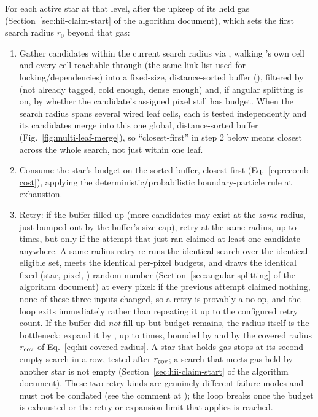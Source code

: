 For each active star at that level, after the upkeep of its held gas
(Section~\ref{sec:hii-claim-start} of the algorithm document), which sets the
first search radius $r_0$ beyond that gas:
\begin{enumerate}
  \item Gather candidates within the current search radius via
    ,
    walking 's own cell and every cell reachable through
     (the same
    link list used for locking/dependencies) into a fixed-size,
    distance-sorted buffer (), filtered by
     (not already tagged, cold
    enough, dense enough) and, if angular splitting is on, by whether
    the candidate's assigned pixel still has budget. When the search
    radius spans several wired leaf cells, each is tested
    independently and its candidates merge into this one global,
    distance-sorted buffer (Fig.~\ref{fig:multi-leaf-merge}), so
    ``closest-first'' in step 2 below means closest across the whole
    search, not just within one leaf.
  \item Consume the star's budget on the sorted buffer, closest first
    (Eq.~\ref{eq:recomb-cost}), applying the deterministic/probabilistic
    boundary-particle rule at exhaustion.
  \item Retry: if the buffer filled up (more candidates may exist at
    the \emph{same} radius, just bumped out by the buffer's size cap),
    retry at the same radius, up to
     times, but only if the
    attempt that just ran claimed at least one candidate anywhere. A
    same-radius retry re-runs the identical search over the identical
    eligible set, meets the identical per-pixel budgets, and draws the
    identical fixed (star, pixel, ) random number
    (Section~\ref{sec:angular-splitting} of the algorithm document) at
    every pixel: if the previous attempt claimed nothing, none of
    these three inputs changed, so a retry is provably a no-op, and
    the loop exits immediately rather than repeating it up to the
    configured retry count. If the buffer did \emph{not} fill up but
    budget remains, the radius itself is the bottleneck: expand it
    by , up to
     times, bounded by
     and by the covered radius
    $r_{\rm cov}$ of Eq.~\eqref{eq:hii-covered-radius}. A star that holds
    gas stops at its second empty search in a row, tested after
    $r_{\rm cov}$; a search that meets gas held by another star is not
    empty (Section~\ref{sec:hii-claim-start} of the algorithm document). These
    two retry kinds are
    genuinely different failure modes and must not be conflated (see
    the comment at ); the
    loop breaks once the budget is exhausted or the retry or expansion
    limit that applies is reached.
\end{enumerate}

